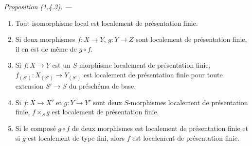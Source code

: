 \documentclass[10pt,oneside]{book}
\makeatletter
\newcommand{\setmanualcurrentlabel}[1]{\def\@currentlabel{#1}}
\newcommand{\oldpage}[2][]{%
  \setcounter{footnote}{0}%
  \marginpar{\scriptsize\textbf{#1}~|~#2}\ignorespaces}
\newenvironment{proposition}[1][]{%
  \setmanualcurrentlabel{#1}\par\medskip\noindent\itshape Proposition (#1). ---\ }{\par}
\makeatother
\begin{document}
\begin{proposition}[1.4.3]
\label{IV.1.4.3-fr}
\begin{enumerate}
  \item[(i)] Tout isomorphisme local est localement de présentation finie.
  \item[(ii)] Si deux morphismes $f:X\to Y$, $g:Y\to Z$ sont localement de
  présentation finie, il en est de même de $g\circ f$.

\oldpage[IV-1]{231}

  \item[(iii)] Si $f:X\to Y$ est un $S$-morphisme localement de présentation
  finie, $f_{(S')}:X_{(S')}\to Y_{(S')}$ est localement de présentation finie
  pour toute extension $S'\to S$ du préschéma de base.
  \item[(iv)] Si $f:X\to X'$ et $g:Y\to Y'$ sont deux $S$-morphismes
  localement de présentation finie, $f\times_Sg$ est localement de
  présentation finie.
  \item[(v)] Si le composé $g\circ f$ de deux morphismes est localement de
  présentation finie et si $g$ est localement de type fini, alors $f$ est
  localement de présentation finie.
\end{enumerate}
\end{proposition}
\end{document}
